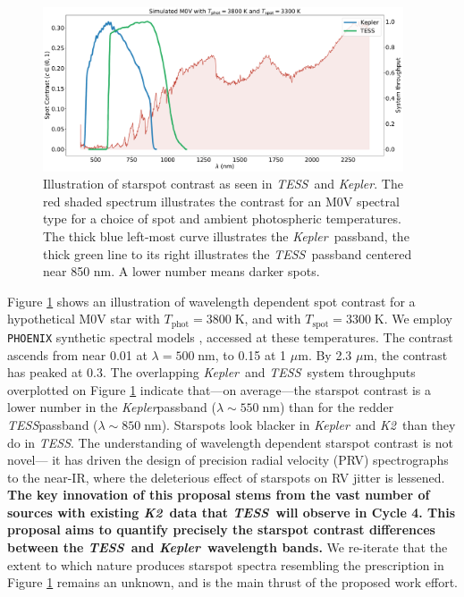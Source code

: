 \documentclass[letterpaper,12pt]{article}
\newcommand{\tess}{{\it TESS}}
\newcommand{\kepler}{{\it Kepler}}
\newcommand{\ktwo}{{\it K2}}
\begin{document}



\begin{figure}[hbt!]
    \includegraphics[width=0.95\textwidth]{figures/contrast_spectrum.pdf}
    \caption{Illustration of starspot contrast as seen in \tess\ and \kepler. The red shaded spectrum illustrates the contrast for an M0V spectral type for a choice of spot and ambient photospheric temperatures. The thick blue left-most curve illustrates the \kepler\ passband, the thick green line to its right illustrates the \tess\ passband centered near 850 nm.  A lower number means darker spots.  }
    \label{fig:filtercurve}
\end{figure}

Figure \ref{fig:filtercurve} shows an illustration of wavelength dependent spot contrast for a hypothetical M0V star with $T_\text{phot}=3800\;$K, and with $T_\text{spot}=3300\;$K.  We employ \texttt{PHOENIX} synthetic spectral models \cite{2013A&A...553A...6H}, accessed at these temperatures.  The contrast ascends from near 0.01 at $\lambda=500\;$nm, to 0.15 at 1 $\mu$m.  By 2.3 $\mu$m, the contrast has peaked at 0.3.  The overlapping \kepler\ and \tess\ system throughputs overplotted on Figure \ref{fig:filtercurve} indicate that---on average---the starspot contrast is a lower number in the \kepler passband ($\lambda \sim 550\;$nm)  than for the redder \tess passband ($\lambda \sim 850\;$nm).  Starspots look blacker in \kepler\ and \ktwo\ than they do in \tess.  The understanding of wavelength dependent starspot contrast is not novel--- it has driven the design of precision radial velocity (PRV) spectrographs to the near-IR, where the deleterious effect of starspots on RV jitter is lessened.  \textbf{The key innovation of this proposal stems from the vast number of sources with existing \ktwo\ data that \tess\ will observe in Cycle 4.  This proposal aims to quantify precisely the starspot contrast differences between the \tess\ and \kepler\ wavelength bands.}  We re-iterate that the extent to which nature produces starspot spectra resembling the prescription in Figure \ref{fig:filtercurve} remains an unknown, and is the main thrust of the proposed work effort.  
\end{document}
